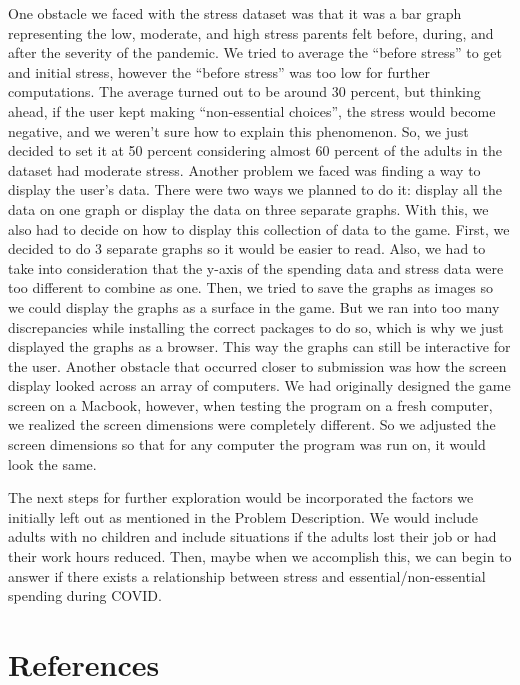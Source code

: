 \documentclass[fontsize=11pt]{article}
\begin{document}
    One obstacle we faced with the stress dataset was that it was a bar graph representing the low, moderate, and high stress parents felt before, during, and after the severity of the pandemic. We tried to average the “before stress” to get and initial stress, however the “before stress” was too low for further computations. The average turned out to be around 30 percent, but thinking ahead, if the user kept making “non-essential choices”, the stress would become negative, and we weren’t sure how to explain this phenomenon. So, we just decided to set it at 50 percent considering almost 60 percent of the adults in the dataset had moderate stress. Another problem we faced was finding a way to display the user’s data. There were two ways we planned to do it: display all the data on one graph or display the data on three separate graphs. With this, we also had to decide on how to display this collection of data to the game. First, we decided to do 3 separate graphs so it would be easier to read. Also, we had to take into consideration that the y-axis of the spending data and stress data were too different to combine as one. Then, we tried to save the graphs as images so we could display the graphs as a surface in the game. But we ran into too many discrepancies while installing the correct packages to do so, which is why we just displayed the graphs as a browser. This way the graphs can still be interactive for the user. Another obstacle that occurred closer to submission was how the screen display looked across an array of computers. We had originally designed the game screen on a Macbook, however, when testing the program on a fresh computer, we realized the screen dimensions were completely different. So we adjusted the screen dimensions so that for any computer the program was run on, it would look the same.

    The next steps for further exploration would be incorporated the factors we initially left out as mentioned in the Problem Description. We would include adults with no children and include situations if the adults lost their job or had their work hours reduced. Then, maybe when we accomplish this, we can begin to answer if there exists a relationship between stress and essential/non-essential spending during COVID.




    \section*{References}
\end{document}
